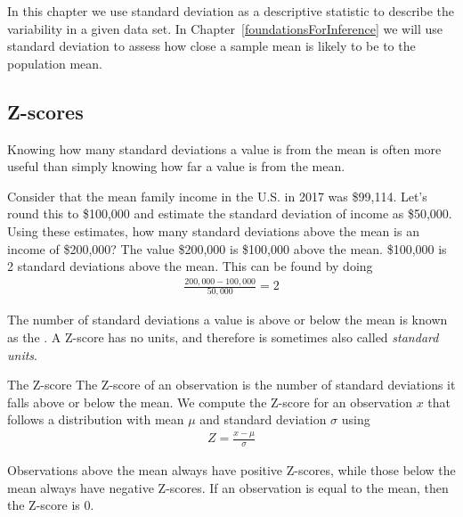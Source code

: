 In this chapter we use standard deviation as a descriptive statistic to describe the variability in a given data set. In Chapter~\ref{foundationsForInference} we will use standard deviation to assess how close a sample mean is likely to be to the population mean.


\D{\newpage}

\subsection{Z-scores}



Knowing how many standard deviations a value is from the mean is often more useful than simply knowing how far a value is from the mean.

\begin{examplewrap}
\begin{nexample}
{Consider that the mean family income in the U.S. in 2017 was \$99,114. Let's round this to \$100,000 and estimate the standard deviation of income as \$50,000.  Using these estimates, how many standard deviations above the mean is an income of \$200,000?  }
The value \$200,000 is \$100,000 above the mean.  \$100,000 is 2 standard deviations above the mean.  This can be found by doing
  \begin{align*}
  \frac{200,000 - 100,000}{50,000} = 2
  \end{align*}
\end{nexample}
\end{examplewrap}

The number of standard deviations a value is above or below the mean is known as the .  A Z-score has no units, and therefore is sometimes also called \emph{standard units}.

\begin{onebox}{The Z-score}
  The Z-score of an observation is the number of standard
  deviations it falls above or below the mean.
  We compute the Z-score for an observation $x$ that follows
  a distribution with mean $\mu$ and standard deviation
  $\sigma$ using
  \begin{align*}
  Z = \frac{x - \mu}{\sigma}
  \end{align*}
\end{onebox}

Observations above the mean always have positive Z-scores,
while those below the mean always have negative Z-scores.
If an observation is equal to the mean, then the Z-score is $0$.

